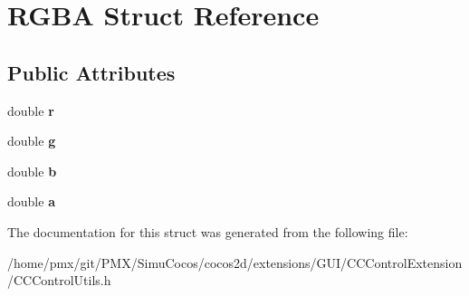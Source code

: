 \hypertarget{structRGBA}{}\section{R\+G\+BA Struct Reference}
\label{structRGBA}
\subsection*{Public Attributes}
\begin{DoxyCompactItemize}
\item 
\mbox{\label{structRGBA_a8a194f568fc7b1b0894705f54d2f05e7}} 
double {\bfseries r}
\item 
\mbox{\label{structRGBA_a303706123761f308f1a83a7202cea041}} 
double {\bfseries g}
\item 
\mbox{\label{structRGBA_a38464ee29a7e1b065ca76cf6adfcd1a1}} 
double {\bfseries b}
\item 
\mbox{\label{structRGBA_aece50fd5ce43e39c9954bfd416aab24c}} 
double {\bfseries a}
\end{DoxyCompactItemize}


The documentation for this struct was generated from the following file\+:\begin{DoxyCompactItemize}
\item 
/home/pmx/git/\+P\+M\+X/\+Simu\+Cocos/cocos2d/extensions/\+G\+U\+I/\+C\+C\+Control\+Extension/C\+C\+Control\+Utils.\+h\end{DoxyCompactItemize}

